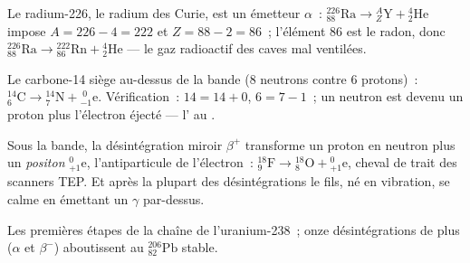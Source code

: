 \begin{example}\label{ex:g11:nucleus-radioactivity:alpha}
Le radium-226, le radium des Curie, est un émetteur $\alpha$~:
${}^{226}_{88}\mathrm{Ra} \to {}^{A}_{Z}\mathrm{Y} + {}^{4}_{2}\mathrm{He}$
impose $A = 226 - 4 = 222$ et
$Z = 88 - 2 = 86$~; l'élément $86$ est le radon, donc
${}^{226}_{88}\mathrm{Ra} \to {}^{222}_{86}\mathrm{Rn} + {}^{4}_{2}\mathrm{He}$
--- le gaz radioactif des caves mal ventilées.
\end{example}

\begin{example}\label{ex:g11:nucleus-radioactivity:beta}
Le carbone-14 siège au-dessus de la bande ($8$ neutrons contre $6$
protons)~:
${}^{14}_{6}\mathrm{C} \to {}^{14}_{7}\mathrm{N} + {}^{\;0}_{-1}\mathrm{e}$.
Vérification~: $14 = 14 + 0$, $6 = 7 - 1$~; un neutron est devenu un
proton plus l'électron éjecté --- l'
 au
.
\end{example}

\begin{remark}\label{rem:g11:nucleus-radioactivity:betaplus}
Sous la bande, la désintégration miroir $\beta^+$ transforme un proton
en neutron plus un \emph{positon}
${}^{0}_{+1}\mathrm{e}$, l'antiparticule de l'électron~:
${}^{18}_{9}\mathrm{F} \to {}^{18}_{8}\mathrm{O} + {}^{0}_{+1}\mathrm{e}$,
cheval de trait des scanners TEP. Et après la plupart des
désintégrations le  fils, né en vibration, se calme en émettant un
$\gamma$ par-dessus.
\end{remark}

\begin{omfigure}

{\small Les premières étapes de la chaîne de l'uranium-238~; onze
désintégrations de plus ($\alpha$ et $\beta^-$) aboutissent au
${}^{206}_{82}\mathrm{Pb}$ stable.}
\end{omfigure}

